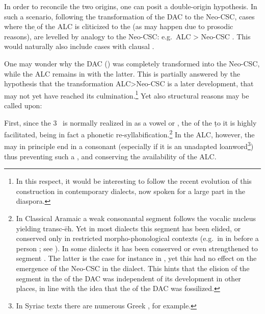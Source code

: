In order to reconcile the two origins, one can posit a double-origin hypothesis. In such a scenario, following the transformation of the DAC to the Neo-CSC, cases where the \d \lnk* of the ALC is cliticized to the \prim (as may happen due to prosodic reasons), are levelled by analogy to the Neo-CSC: e.g.\ ALC  > Neo-CSC . This would naturally also include cases with clausal \secns.




















One may wonder why  the DAC () was completely transformed into the Neo-CSC, while the ALC remains in  with the latter. This is partially answered by the hypothesis that the transformation ALC>Neo-CSC is a later development, that may not yet have reached its culmination.\footnote{In this respect, it would be interesting to follow the recent  evolution of this construction in contemporary  dialects, now spoken for a large part in the diaspora.} Yet  also structural reasons may be called upon:

 First, since the 3\masc\  is normally realized in  as a vowel  or ,  the  of the \d to it is highly facilitated, being in fact a phonetic re-syllabification.\footnote{In Classical Aramaic a weak consonantal segment  follows the vocalic nucleus yielding \mbox{transc{-ēh}}. Yet  in most  dialects this segment has been elided, or conserved only in restricted morpho-phonological contexts (e.g.\ in in \JZax before a \third person ; see \cite[450]{CohenZakho}). In some dialects it has been conserved or even strengthened to  segment  \citep[96]{CoghillNotable}. The latter is the case for instance in \Alq, yet this had no effect on the emergence of the Neo-CSC in the dialect. This hints that the elision of the  segment in the  of the DAC was independent of its development in other places, in line with the idea that the  of the DAC was fossilized.} 
   In the ALC, however, the \prim may in principle end in a consonant (especially if it is an unadapted loanword\footnote{In Syriac texts there are numerous Greek , for example.}) thus preventing such a , and conserving the availability of the ALC. 

